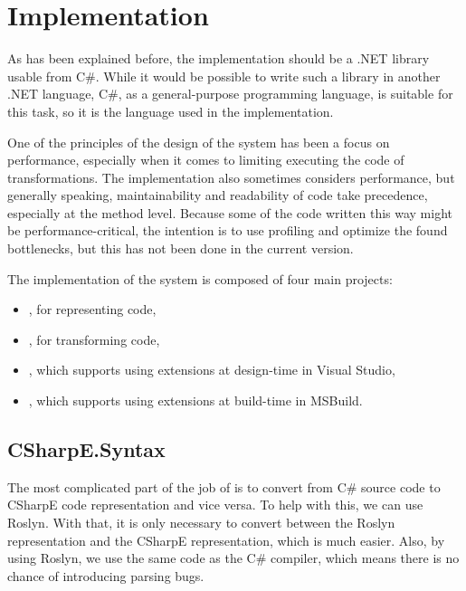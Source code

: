 \chapter{Implementation}

As has been explained before, the implementation should be a .NET library usable from C\#. While it would be possible to write such a library in another .NET language, C\#, as a general-purpose programming language, is suitable for this task, so it is the language used in the implementation.

One of the principles of the design of the system has been a focus on performance, especially when it comes to limiting executing the code of transformations. The implementation also sometimes considers performance, but generally speaking, maintainability and readability of code take precedence, especially at the method level. Because some of the code written this way might be performance-critical, the intention is to use profiling and optimize the found bottlenecks, but this has not been done in the current version.

\medskip

The implementation of the system is composed of four main projects:

\begin{itemize}
\item {}, for representing code,
\item {}, for transforming code,
\item {}, which supports using extensions at design-time in Visual Studio,
\item {}, which supports using extensions at build-time in MSBuild.
\end{itemize}

\section{CSharpE.Syntax}

The most complicated part of the job of  is to convert from C\# source code to CSharpE code representation and vice versa. To help with this, we can use Roslyn. With that, it is only necessary to convert between the Roslyn representation and the CSharpE representation, which is much easier. Also, by using Roslyn, we use the same code as the C\# compiler, which means there is no chance of introducing parsing bugs.

